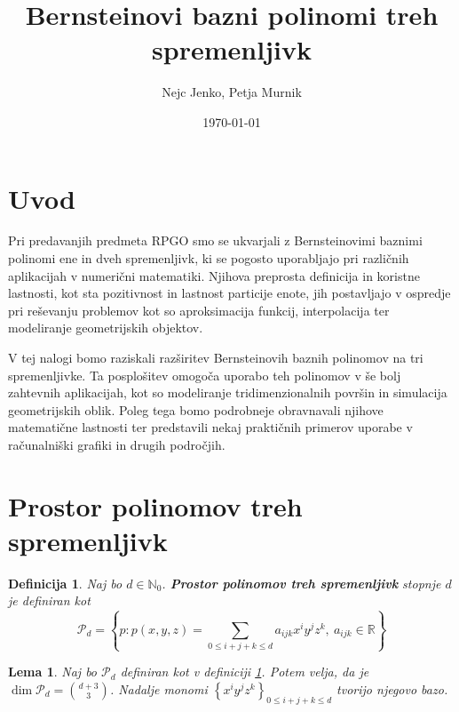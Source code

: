 \documentclass[11pt,a4paper]{article}
\title{\textbf{Bernsteinovi bazni polinomi treh spremenljivk}}
\author{Nejc Jenko, Petja Murnik}
\date{\today}
\newtheorem{definition}{Definicija}
\newtheorem{lemma}{Lema}
\begin{document}
\maketitle
\break

\section{Uvod}

Pri predavanjih predmeta RPGO smo se ukvarjali z Bernsteinovimi baznimi polinomi ene in dveh 
spremenljivk, ki se pogosto uporabljajo pri različnih aplikacijah
v numerični matematiki. Njihova preprosta definicija in koristne lastnosti,
kot sta pozitivnost in lastnost particije enote, jih postavljajo v ospredje pri reševanju problemov
kot so aproksimacija funkcij, interpolacija ter modeliranje geometrijskih objektov.

V tej nalogi bomo raziskali razširitev
Bernsteinovih baznih polinomov na tri spremenljivke.
Ta posplošitev omogoča uporabo teh polinomov v še bolj zahtevnih aplikacijah,
kot so modeliranje tridimenzionalnih površin in simulacija geometrijskih oblik.
Poleg tega bomo podrobneje obravnavali njihove matematične lastnosti ter predstavili nekaj praktičnih primerov 
uporabe v računalniški grafiki in drugih področjih.


\section{Prostor polinomov treh spremenljivk} 

\begin{definition}\label{def_prostor}
    Naj bo $d \in \mathbb{N}_0$. \textbf{Prostor polinomov treh spremenljivk} stopnje $d$ je definiran kot
    \begin{equation}
        \mathcal{P}_d = \left\{ p : p(x, y, z) = \sum_{0 \leq i + j + k \leq d} a_{ijk} x^i y^j z^k , \ a_{ijk} \in \mathbb{R} \right\}    \end{equation}
\end{definition}

\begin{lemma}
    Naj bo $\mathcal{P}_d$ definiran kot v definiciji \ref{def_prostor}.
    Potem velja, da je $\dim \mathcal{P}_d = \binom{d+3}{3} $. 
    Nadalje monomi $\left\{x^i y^j z^k \right\}_{0 \le i  + j + k \le d}$ tvorijo njegovo bazo.
\end{lemma}
\end{document}
